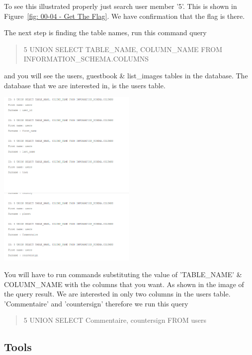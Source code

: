 To see this illustrated properly just search user member '5'. This is shown in
Figure~\vref{fig: 00-04 - Get The Flag}. We have confirmation that the flag is
there.

The next step is finding the table names, run this command query
\begin{quote}
5 UNION SELECT TABLE\_NAME, COLUMN\_NAME FROM INFORMATION\_SCHEMA.COLUMNS
\end{quote}
and you will see the users, guestbook \& list\_images tables in the database. The
database that we are interested in, is the users table.

\begin{center}
    \includegraphics[width=0.5\textwidth]{03.Flag00/00-05.png}\\[0cm]    
\end{center}

You will have to run commands substituting the value of 'TABLE\_NAME' \&
COLUMN\_NAME  with the columns that you want. As shown in the
image of the query result. We are interested in only two columns in the
users table. 'Commentaire' and 'countersign' therefore we run this query
\begin{quote}
    5 UNION SELECT Commentaire, countersign FROM users
\end{quote}

\subsection{Tools}

